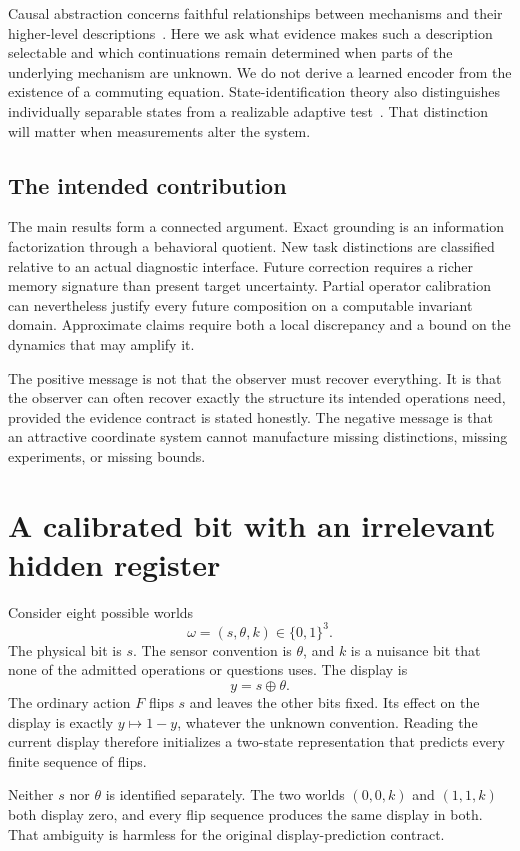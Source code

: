 \documentclass[11pt,letterpaper]{article}
\theoremstyle{plain}
\theoremstyle{definition}
\begin{document}
Causal abstraction concerns faithful relationships between mechanisms and their higher-level descriptions~\cite{causal}. Here we ask what evidence makes such a description selectable and which continuations remain determined when parts of the underlying mechanism are unknown. We do not derive a learned encoder from the existence of a commuting equation. State-identification theory also distinguishes individually separable states from a realizable adaptive test~\cite{stateid}. That distinction will matter when measurements alter the system.

\subsection{The intended contribution}
The main results form a connected argument. Exact grounding is an information factorization through a behavioral quotient. New task distinctions are classified relative to an actual diagnostic interface. Future correction requires a richer memory signature than present target uncertainty. Partial operator calibration can nevertheless justify every future composition on a computable invariant domain. Approximate claims require both a local discrepancy and a bound on the dynamics that may amplify it.

The positive message is not that the observer must recover everything. It is that the observer can often recover exactly the structure its intended operations need, provided the evidence contract is stated honestly. The negative message is that an attractive coordinate system cannot manufacture missing distinctions, missing experiments, or missing bounds.

\section{A calibrated bit with an irrelevant hidden register}\label{sec:sensor}
Consider eight possible worlds
\[
\omega=(s,\theta,k)\in\{0,1\}^3.
\]
The physical bit is $s$. The sensor convention is $\theta$, and $k$ is a nuisance bit that none of the admitted operations or questions uses. The display is
\[
y=s\oplus\theta.
\]
The ordinary action $F$ flips $s$ and leaves the other bits fixed. Its effect on the display is exactly $y\mapsto1-y$, whatever the unknown convention. Reading the current display therefore initializes a two-state representation that predicts every finite sequence of flips.

Neither $s$ nor $\theta$ is identified separately. The two worlds $(0,0,k)$ and $(1,1,k)$ both display zero, and every flip sequence produces the same display in both. That ambiguity is harmless for the original display-prediction contract.
\end{document}
